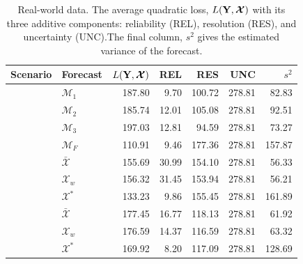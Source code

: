 \documentclass[11pt]{article}
\theoremstyle{definition}
\theoremstyle{definition}
\def\Y{{\bf Y}}
\begin{document}
\begin{table}[h!]
\centering
\caption{Real-world data. The average quadratic loss, $L(\Y,\boldsymbol{\mathcal{X}} )$ with its three additive components: reliability (REL), resolution (RES), and uncertainty (UNC).The final column, $s^2$ gives the estimated variance of the forecast. } 
\begin{tabular}{llrrrrr}
  \hline \hline
Scenario &  Forecast & $L(\Y,\boldsymbol{\mathcal{X}} )$ & REL & RES & UNC & $s^2$\\ 
  \hline
 &  $\mathcal{M}_1$ & 187.80 & 9.70 & 100.72 & 278.81 & 82.83 \\ 
& $\mathcal{M}_2$  & 185.74 & 12.01 & 105.08 & 278.81 & 92.51 \\ 
  & $\mathcal{M}_3$ & 197.03 & 12.81 & 94.59 & 278.81 & 73.27 \\ 
&$\mathcal{M}_F$  & 110.91 & 9.46 & 177.36 & 278.81 & 157.87 \\ \rule{0pt}{2.9ex} 
\multirow{3}{*}{No Overlap} &  $\bar{\mathcal{X}}$ & 155.69 & 30.99 & 154.10 & 278.81 & 56.33 \\ 
 & $\mathcal{X}_w$ & 156.32 & 31.45 & 153.94 & 278.81 & 56.21 \\ 
  &$\mathcal{X}^*$ & 133.23 & 9.86 & 155.45 & 278.81 & 161.89 \\ \rule{0pt}{2.9ex} 
 \multirow{3}{*}{High Overlap}  & $\bar{\mathcal{X}}$ & 177.45 & 16.77 & 118.13 & 278.81 & 61.92 \\ 
  & $\mathcal{X}_w$ & 176.59 & 14.37 & 116.59 & 278.81 & 63.32 \\ 
 & $\mathcal{X}^*$ & 169.92 & 8.20 & 117.09 & 278.81 & 128.69 \\ 
\hline
\end{tabular}
\label{NoTbl}
\end{table}
\end{document}
